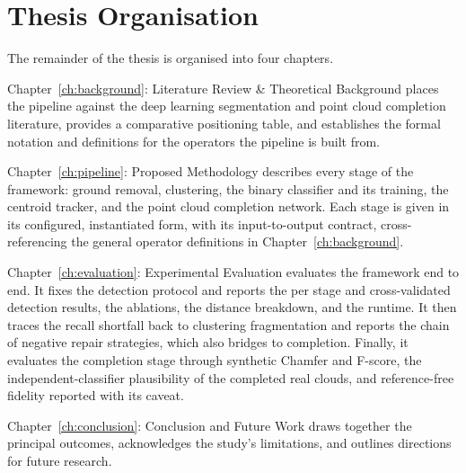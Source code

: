 \section{Thesis Organisation}
\label{sec:intro-outline}

The remainder of the thesis is organised into four chapters.

Chapter~\ref{ch:background}: Literature Review \& Theoretical Background
places the pipeline against the deep learning segmentation and point cloud completion
literature, provides a comparative positioning table, and establishes the formal
notation and definitions for the operators the pipeline is built from.

Chapter~\ref{ch:pipeline}: Proposed Methodology describes every stage of the
framework: ground removal, clustering, the binary classifier and its training, the
centroid tracker, and the point cloud completion network. Each stage is given in its
configured, instantiated form, with its input-to-output contract, cross-referencing the
general operator definitions in Chapter~\ref{ch:background}.

Chapter~\ref{ch:evaluation}: Experimental Evaluation evaluates the framework
end to end. It fixes the detection protocol and reports the per stage and
cross-validated detection results, the ablations, the distance breakdown, and the
runtime. It then traces the recall shortfall back to clustering fragmentation and
reports the chain of negative repair strategies, which also bridges to completion.
Finally, it evaluates the completion stage through synthetic Chamfer and F-score, the
independent-classifier plausibility of the completed real clouds, and reference-free
fidelity reported with its caveat.

Chapter~\ref{ch:conclusion}: Conclusion and Future Work draws together the
principal outcomes, acknowledges the study's limitations, and outlines directions for
future research.

